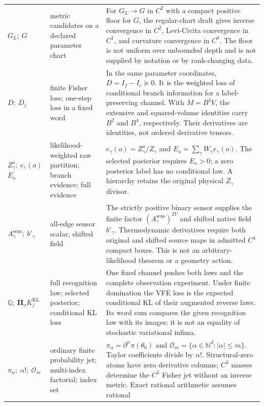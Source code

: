 \begin{longtable}{@{}>{\raggedright\arraybackslash}p{}
>{\raggedright\arraybackslash}p{}
>{\raggedright\arraybackslash}p{}@{}}
\(G_L;\ G\) &
metric candidates on a declared parameter chart &
For \(G_L\to G\) in \(C^2\) with a compact positive floor for \(G\),
the regular-chart draft gives inverse convergence in \(C^2\),
Levi-Civita convergence in \(C^1\), and curvature convergence in
\(C^0\). The floor is not uniform over unbounded depth and is not
supplied by notation or by rank-changing data. \\
\(D;\ D_j\) &
finite Fisher loss; one-step loss in a fixed word &
In the same parameter coordinates, \(D=I_f-I_c\succeq0\).
It is the weighted loss of conditional branch information for a
label-preserving channel. With \(M=B^2V\), the extensive and
squared-volume identities carry \(B^2\) and \(B^4\), respectively.
Their derivatives are identities, not ordered derivative tensors. \\
\(Z_\gamma^o;\ e_\gamma(o)\)\newline \(E_o\) &
likelihood-weighted raw partition; branch evidence; full evidence &
\(e_\gamma(o)=Z_\gamma^o/Z_\gamma\) and
\(E_o=\sum_\gamma W_\gamma e_\gamma(o)\).
The selected posterior requires \(E_o>0\); a zero posterior label
has no conditional law. A hierarchy retains the original physical
\(Z_\gamma\) divisor. \\
\(A_\gamma^{\mathrm{sens}};\ b'_\gamma\) &
all-edge sensor scalar; shifted field &
The strictly positive binary sensor supplies the finite factor
\((A_\gamma^{\mathrm{sens}})^{2V}\) and shifted native field
\(b'_\gamma\). Thermodynamic derivatives require both original and
shifted source maps in admitted \(C^4\) compact boxes.
This is not an arbitrary-likelihood theorem or a geometry action. \\
\(\mathbb Q;\ \boldsymbol\Pi_o\)\newline \(K_j^{\mathrm{KL}}\) &
full recognition law; selected posterior; conditional KL loss &
One fixed channel pushes both laws and the complete observation experiment.
Under finite domination the VFE loss is the expected conditional KL of
their augmented reverse laws. Its word sum compares the given recognition
law with its images; it is not an equality of stochastic variational infima. \\
\(\pi_\alpha;\ \alpha!;\ \mathcal O_m\) &
ordinary finite probability jet; multi-index factorial; index set &
\(\pi_\alpha=\partial^\alpha\pi(\theta_0)\) and
\(\mathcal O_m=\{\alpha\in\mathbb N^d:|\alpha|\leq m\}\).
Taylor coefficients divide by \(\alpha!\). Structural-zero atoms have
zero derivative columns; \(C^3\) masses determine the \(C^2\) Fisher
jet without an inverse metric. Exact rational arithmetic assumes rational

\end{longtable}
